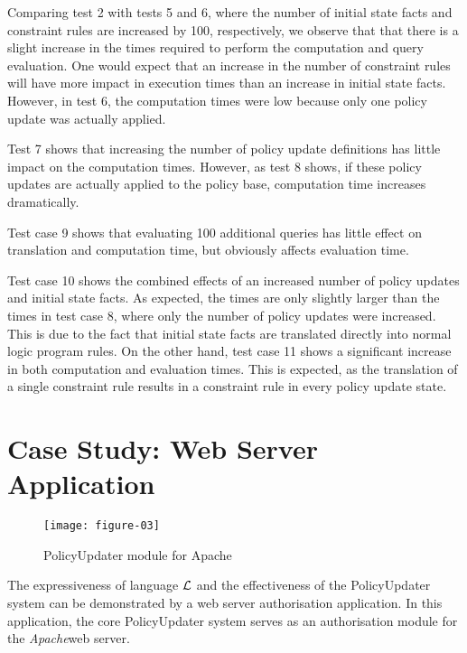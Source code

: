 \documentclass[global,twocolumn,final]{svjour}
\begin{document}
      Comparing test 2 with tests 5 and 6, where the number of initial state
      facts and constraint rules are increased by 100, respectively, we observe
      that that there is a slight increase in the times required to perform the
      computation and query evaluation. One would expect that an increase in
      the number of constraint rules will have more impact in execution times
      than an increase in initial state facts. However, in test 6, the
      computation times were low because only one policy update was actually
      applied.

      Test 7 shows that increasing the number of policy update definitions
      has little impact on the computation times. However, as test 8 shows,
      if these policy updates are actually applied to the policy base,
      computation time increases dramatically.

      Test case 9 shows that evaluating 100 additional queries has little
      effect on translation and computation time, but obviously affects
      evaluation time.

      Test case 10 shows the combined effects of an increased number of policy
      updates and initial state facts. As expected, the times are only slightly
      larger than the times in test case 8, where only the number of policy
      updates were increased. This is due to the fact that initial state facts
      are translated directly into normal logic program rules. On the other
      hand, test case 11 shows a significant increase in both computation and
      evaluation times. This is expected, as the translation of a single
      constraint rule results in a constraint rule in every policy update
      state.

  \section{Case Study: Web Server Application}
    \label{sec-case}

    \begin{figure}[ht]
      \begin{center}
        \texttt{[image: figure-03]}
        \caption{PolicyUpdater module for Apache}
        \label{fig-3}
      \end{center}
    \end{figure}

    The expressiveness of language $\cal{L}$ and the effectiveness of the
    PolicyUpdater system can be demonstrated by a web server authorisation
    application. In this application, the core PolicyUpdater system serves as
    an authorisation module for the {\em Apache}\footnotemark web server.
\end{document}
